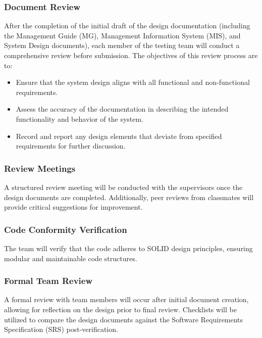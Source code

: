 \documentclass[12pt, titlepage]{article}
\begin{document}
\subsubsection{Document Review}
After the completion of the initial draft of the design documentation (including
the Management Guide (MG), Management Information System (MIS), and System
Design documents), each member of the testing team will conduct a comprehensive
review before submission. The objectives of this review process are to:
\begin{itemize}
  \item Ensure that the system design aligns with all functional and
  non-functional requirements.
  \item Assess the accuracy of the documentation in describing the intended
  functionality and behavior of the system.
  \item Record and report any design elements that deviate from specified
  requirements for further discussion.
\end{itemize}

\subsubsection{Review Meetings}
A structured review meeting will be conducted with the supervisors once the
design documents are completed. Additionally, peer reviews from classmates will
provide critical suggestions for improvement.

\subsubsection{Code Conformity Verification}
The team will verify that the code adheres to SOLID design principles, ensuring
modular and maintainable code structures.

\subsubsection{Formal Team Review}
A formal review with team members will occur after initial document creation,
allowing for reflection on the design prior to final review. Checklists will be
utilized to compare the design documents against the Software Requirements
Specification (SRS) post-verification.
\end{document}
